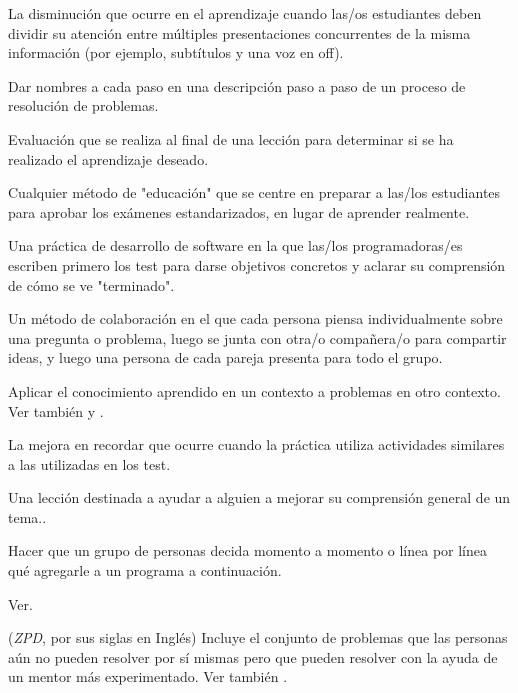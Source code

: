 \begin{description}
 La disminución que ocurre 
en el aprendizaje cuando las/os estudiantes deben dividir su atención entre múltiples presentaciones concurrentes de la misma información (por ejemplo, subtítulos y una voz en off).


 Dar nombres a cada paso en una descripción
paso a paso de un proceso de resolución de problemas.

 Evaluación que se realiza al final de una lección para determinar si se ha realizado el aprendizaje deseado.



 Cualquier método de "educación" 
que se centre en preparar a las/los estudiantes para aprobar los exámenes estandarizados, en lugar de aprender realmente.

 Una práctica de desarrollo 
de software en la que las/los programadoras/es escriben primero los test 
para darse objetivos concretos y aclarar su comprensión de cómo se ve "terminado".

 Un método de colaboración 
en el que cada persona piensa individualmente sobre una pregunta o problema,
luego se junta con otra/o compañera/o para compartir ideas, y luego una persona de 
cada pareja presenta para todo el grupo.

 Aplicar el conocimiento aprendido en un contexto a problemas en otro contexto.  Ver también
 y .

 La mejora en  recordar que ocurre cuando la práctica utiliza actividades similares a las utilizadas en los test.

 Una lección destinada a ayudar a alguien a 
mejorar su comprensión general de un tema..

Hacer que un grupo de personas decida momento a momento 
o línea por línea qué agregarle a un programa a continuación.

 Ver.

 (\emph{ZPD}, por sus siglas en Inglés) Incluye el conjunto de problemas que las personas aún no pueden resolver por sí mismas pero que pueden resolver con la ayuda de un mentor más experimentado.  Ver también .

\end{description}
